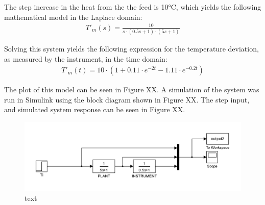 \documentclass{article}
\begin{document}
The step increase in the heat from the the feed is 10$\si{\degreeCelsius}$, which yields the following mathematical model in the Laplace domain:
\begin{align*}
T'_m(s) = \frac{10}{s \cdot (0.5s + 1) \cdot (5s + 1)}
\end{align*}

Solving this system yields the following expression for the temperature deviation, as measured by the instrument, in the time domain:
\begin{align}
T'_m(t) = 10 \cdot (1 + 0.11 \cdot e^{-2t} - 1.11 \cdot e^{-0.2t})
\end{align} 

The plot of this model can be seen in Figure XX. A simulation of the system was run in Simulink using the block diagram shown in Figure XX. The step input, and simulated system response can be seen in Figure XX.

\begin{figure}[h]
\centering
\includegraphics[scale=0.2]{block_2}
\caption{text}
\end{figure}
\end{document}
